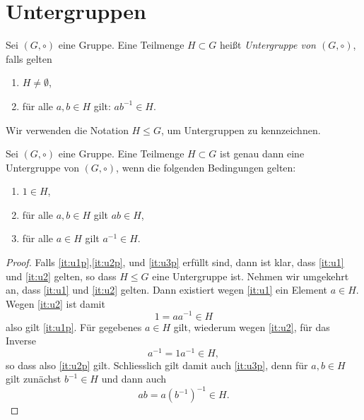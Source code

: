 \documentclass{book}
\begin{document}
\section{Untergruppen}%
\label{sec:untergruppen}

\begin{defi}
    Sei $(G,\circ)$ eine Gruppe. Eine Teilmenge $H \subset G$ heißt {\em Untergruppe von $(G,\circ)$}, falls gelten 
    \begin{enumerate}[leftmargin=1.2cm,label=(U\arabic*)]
        \item\label{it:u1} $H \neq \emptyset$,
        \item\label{it:u2} für alle $a,b \in H$ gilt: $a b^{-1} \in H$. 
    \end{enumerate}
    Wir verwenden die Notation $H \leq G$, um Untergruppen zu kennzeichnen.
\end{defi}

\begin{prop}
    \label{prop:untergruppe}
    Sei $(G,\circ)$ eine Gruppe. Eine Teilmenge $H \subset G$ ist genau dann
    eine Untergruppe von $(G,\circ)$, wenn die folgenden Bedingungen
    gelten:
    \begin{enumerate}[leftmargin=1.2cm,label=(U\arabic*')]
        \item\label{it:u1p} $1 \in H$, 
        \item\label{it:u2p} für alle $a,b \in H$ gilt $ab \in H$, 
        \item\label{it:u3p} für alle $a \in H$ gilt $a^{-1} \in H$. 
    \end{enumerate}
\end{prop}
\begin{proof}
    Falls \ref{it:u1p},\ref{it:u2p}, und \ref{it:u3p} erfüllt sind, dann ist klar, dass
    \ref{it:u1} und \ref{it:u2} gelten, so dass $H \leq G$ eine Untergruppe
    ist. Nehmen wir umgekehrt an, dass \ref{it:u1} und \ref{it:u2} gelten.
    Dann existiert wegen \ref{it:u1} ein Element $a \in H$. Wegen \ref{it:u2} ist damit
    \[
        1 = a a^{-1} \in H
    \]
    also gilt \ref{it:u1p}. Für gegebenes $a \in H$ gilt, wiederum wegen
    \ref{it:u2}, für das Inverse
    \[
        a^{-1} = 1 a^{-1} \in H,
    \]
    so dass also \ref{it:u2p} gilt. Schliesslich gilt damit auch \ref{it:u3p},
    denn für $a,b \in H$ gilt zunächst $b^{-1} \in H$ und dann auch
    \[
        a b = a (b^{-1})^{-1} \in H.
    \]
\end{proof}
\end{document}
